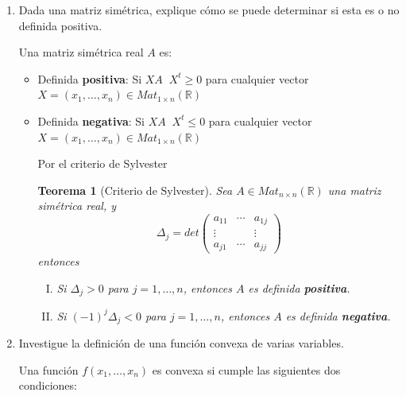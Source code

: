 \documentclass[12pt]{article}
\newtheorem{theorem}{Teorema}
\begin{document}
\begin{enumerate}
    \item Dada una matriz simétrica, explique cómo se puede determinar si esta es o no definida positiva.
    
    Una matriz simétrica real $A$ es:
    \begin{itemize}
        \item Definida \textbf{positiva}: Si $X A \; \; X^{t} \geq 0$ para cualquier vector $X=(x_1,\dots,x_n) \in Mat_{1\times n}(\mathbb{R})$
        \item Definida \textbf{negativa}: Si $X A \; \; X^{t} \leq 0$ para cualquier vector $X=(x_1,\dots,x_n) \in Mat_{1\times n}(\mathbb{R})$
        
        Por el criterio de Sylvester
        \begin{theorem}[Criterio de Sylvester]
            Sea $A \in Mat_{n\times n}(\mathbb{R})$ una matriz simétrica real, y
            \[\Delta_j = det \begin{pmatrix}
                a_{11} & \cdots & a_{1j} \\
                \vdots & & \vdots \\
                a_{j1} & \cdots & a_{jj}
            \end{pmatrix}\] entonces
            \begin{enumerate}[I.]
                \item Si $\Delta_j >0$ para $j=1,\dots,n$, entonces $A$ es definida \textbf{positiva}.
                \item Si $(-1)^j\Delta_j <0$ para $j=1,\dots,n$, entonces $A$ es definida \textbf{negativa}.
            \end{enumerate}
        \end{theorem}
    \end{itemize}
    \item Investigue la definición de una función convexa de varias variables.
    
    Una función $f(x_1,\dots,x_n)$ es convexa si cumple las siguientes dos condiciones:


\end{enumerate}
\end{document}
